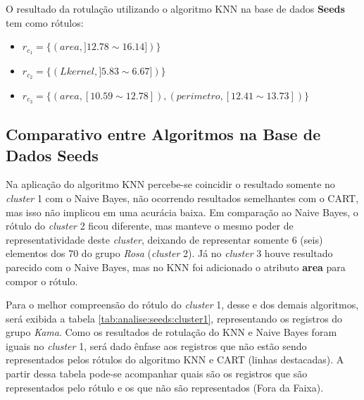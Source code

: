O resultado da rotulação utilizando o algoritmo KNN na base de dados \textbf{Seeds} tem como rótulos: 
\begin{itemize}[noitemsep]
 \item ${r_{c_1}=\{ (area, ]12.78 \sim 16.14]) \} }$
 \item ${r_{c_2}=\{ (Lkernel, ]5.83 \sim 6.67]) \} }$
 \item ${r_{c_3}=\{ (area, [10.59 \sim 12.78]), (perimetro, [12.41 \sim 13.73]) \} }$
 
\end{itemize}


\subsection{Comparativo entre Algoritmos na Base de Dados Seeds} \label{cap:resultados:ssec:compalgoritmos:seeds}

Na aplicação do algoritmo KNN percebe-se coincidir o resultado somente no \textit{cluster} 1 com o Naive Bayes, não ocorrendo resultados semelhantes com o CART, mas isso não implicou em uma acurácia baixa. Em comparação ao Naive Bayes, o rótulo do \textit{cluster} 2 ficou diferente, mas manteve o mesmo poder de representatividade deste \textit{cluster}, deixando de representar somente 6 (seis) elementos dos 70 do grupo \textit{Rosa} (\textit{cluster} 2). Já no \textit{cluster} 3 houve resultado parecido com o Naive Bayes, mas no KNN foi adicionado o  atributo \textbf{area} para compor o rótulo.


Para o melhor compreensão do rótulo do \textit{cluster} 1, desse e dos demais  algoritmos, será exibida a tabela \ref{tab:analise:seeds:cluster1}, representando os registros do grupo \textit{Kama}. Como os resultados de rotulação do KNN e Naive Bayes foram iguais no \textit{cluster} 1, será dado ênfase aos registros que não estão sendo representados pelos rótulos do algoritmo KNN e CART (linhas destacadas). A partir dessa tabela pode-se acompanhar quais são os registros que são representados pelo rótulo e os que não são representados (Fora da Faixa). 


